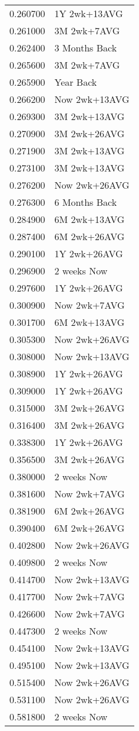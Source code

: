 \begin{tabular}{rl}
0.260700 & 1Y 2wk+13AVG \\
0.261000 & 3M 2wk+7AVG \\
0.262400 & 3 Months Back \\
0.265600 & 3M 2wk+7AVG \\
0.265900 & Year Back \\
0.266200 & Now 2wk+13AVG \\
0.269300 & 3M 2wk+13AVG \\
0.270900 & 3M 2wk+26AVG \\
0.271900 & 3M 2wk+13AVG \\
0.273100 & 3M 2wk+13AVG \\
0.276200 & Now 2wk+26AVG \\
0.276300 & 6 Months Back \\
0.284900 & 6M 2wk+13AVG \\
0.287400 & 6M 2wk+26AVG \\
0.290100 & 1Y 2wk+26AVG \\
0.296900 & 2 weeks Now \\
0.297600 & 1Y 2wk+26AVG \\
0.300900 & Now 2wk+7AVG \\
0.301700 & 6M 2wk+13AVG \\
0.305300 & Now 2wk+26AVG \\
0.308000 & Now 2wk+13AVG \\
0.308900 & 1Y 2wk+26AVG \\
0.309000 & 1Y 2wk+26AVG \\
0.315000 & 3M 2wk+26AVG \\
0.316400 & 3M 2wk+26AVG \\
0.338300 & 1Y 2wk+26AVG \\
0.356500 & 3M 2wk+26AVG \\
0.380000 & 2 weeks Now \\
0.381600 & Now 2wk+7AVG \\
0.381900 & 6M 2wk+26AVG \\
0.390400 & 6M 2wk+26AVG \\
0.402800 & Now 2wk+26AVG \\
0.409800 & 2 weeks Now \\
0.414700 & Now 2wk+13AVG \\
0.417700 & Now 2wk+7AVG \\
0.426600 & Now 2wk+7AVG \\
0.447300 & 2 weeks Now \\
0.454100 & Now 2wk+13AVG \\
0.495100 & Now 2wk+13AVG \\
0.515400 & Now 2wk+26AVG \\
0.531100 & Now 2wk+26AVG \\
0.581800 & 2 weeks Now \\
\hline
\end{tabular}
